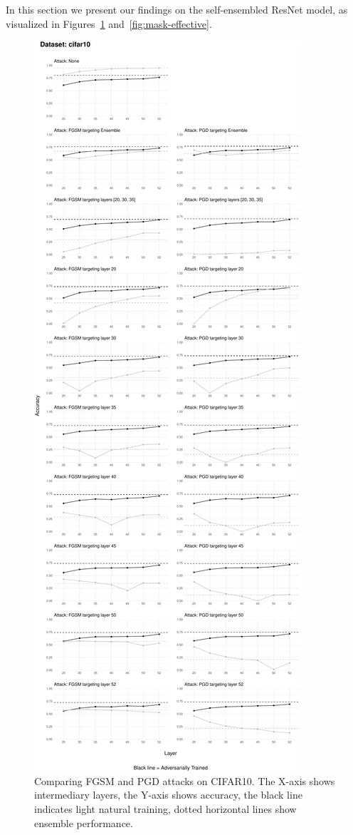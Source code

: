 \documentclass[a4paper, oneside]{discothesis}
\begin{document}
In this section we present our findings on the self-ensembled ResNet model, as visualized in Figures~\ref{fig:fgsm-pgd} and~\ref{fig:mask-effective}.




\begin{figure}
	\centering
	\includegraphics[width=\textwidth,height=\textheight,keepaspectratio]{figures/self_ensemble_fgsm_pgd_cifar10.pdf}
	\caption{Comparing FGSM and PGD attacks on CIFAR10. The X-axis shows intermediary layers, the Y-axis shows accuracy, the black line indicates light natural training, dotted horizontal lines show ensemble performance.}
	\label{fig:fgsm-pgd}
\end{figure}
\end{document}
